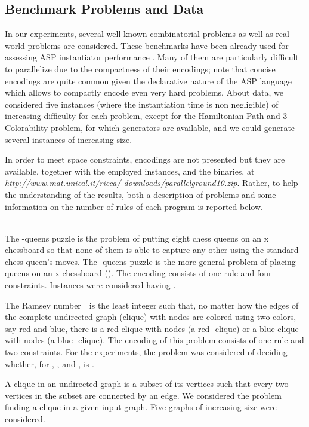 \documentclass[preprint]{tlp}
\begin{document}
\subsection{Benchmark Problems and Data}
In our experiments, several well-known combinatorial problems as well as real-world problems are considered.
These benchmarks have been already used for assessing ASP instantiator
performance \cite{leon-etal-2002-dlv,gebs-etal-2007-lpnmr-competition,devebogetr09a}.
Many of them are particularly difficult to parallelize
due to the compactness of their encodings;
note that concise encodings are quite common given
the declarative nature of the ASP language which allows to compactly
encode even very hard problems.
About data, we considered five instances (where the instantiation time is non negligible) of
increasing difficulty for each problem, except for the Hamiltonian Path and
3-Colorability problem, for which generators are available,
and we could generate several instances of increasing size.

In order  to meet space constraints, encodings are not
presented but they are available, together with the employed
instances, and the binaries, at
{\em http://www.mat.unical.it/ricca/ downloads/parallelground10.zip}. Rather,
to help the understanding of the results, both a description of problems and some information
on the number of rules of each program is reported below.

\ \\
The -queens puzzle is the problem of putting eight chess queens
on an x chessboard so that none of them is able to capture
any other using the standard chess queen's moves.
The -queens puzzle is the more general problem of
placing  queens on an x chessboard ().
The encoding consists of one rule and four constraints.
Instances were considered having .

The Ramsey number\ \ is the least integer  such
that, no matter how the edges of the complete undirected graph
(clique) with  nodes are colored using two colors, say red and
blue, there is a red clique with  nodes (a red -clique) or a
blue clique with  nodes (a blue -clique). The encoding of this
problem consists of one rule and two constraints. For the
experiments, the problem was considered of deciding whether, for
, , and ,  is .

A clique in an undirected graph  is a subset of its vertices such that every two
vertices in the subset are connected by an edge. We considered the problem
finding a clique in a given input graph.
Five graphs of increasing size were considered.
\end{document}
